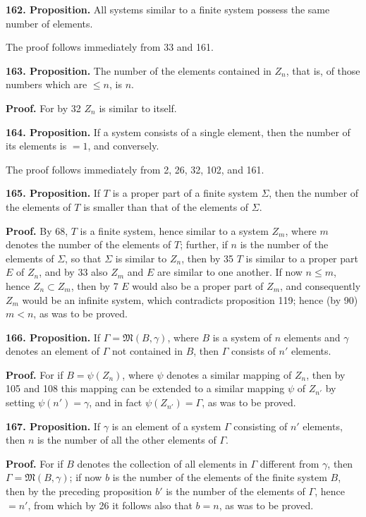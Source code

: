 \documentclass[11pt]{article}
\newcommand{\Mf}{\mathfrak{M}}
\newcommand{\partof}{\mathrel{\subset}}
\begin{document}
\noindent\textbf{162. Proposition.} All systems similar to a finite system possess the same number of elements.

The proof follows immediately from 33 and 161.

\noindent\textbf{163. Proposition.} The number of the elements contained in $Z_n$, that is, of those numbers which are $\leq n$, is $n$.

\noindent\textbf{Proof.} For by 32 $Z_n$ is similar to itself.

\noindent\textbf{164. Proposition.} If a system consists of a single element, then the number of its elements is $=1$, and conversely.

The proof follows immediately from 2, 26, 32, 102, and 161.

\noindent\textbf{165. Proposition.} If $T$ is a proper part of a finite system $\Sigma$, then the number of the elements of $T$ is smaller than that of the elements of $\Sigma$.

\noindent\textbf{Proof.} By 68, $T$ is a finite system, hence similar to a system $Z_m$, where $m$ denotes the number of the elements of $T$; further, if $n$ is the number of the elements of $\Sigma$, so that $\Sigma$ is similar to $Z_n$, then by 35 $T$ is similar to a proper part $E$ of $Z_n$, and by 33 also $Z_m$ and $E$ are similar to one another. If now $n\leq m$, hence $Z_n\partof Z_m$, then by 7 $E$ would also be a proper part of $Z_m$, and consequently $Z_m$ would be an infinite system, which contradicts proposition 119; hence (by 90) $m<n$, as was to be proved.

\noindent\textbf{166. Proposition.} If $\Gamma=\Mf(B,\gamma)$, where $B$ is a system of $n$ elements and $\gamma$ denotes an element of $\Gamma$ not contained in $B$, then $\Gamma$ consists of $n'$ elements.

\noindent\textbf{Proof.} For if $B=\psi(Z_n)$, where $\psi$ denotes a similar mapping of $Z_n$, then by 105 and 108 this mapping can be extended to a similar mapping $\psi$ of $Z_{n'}$ by setting $\psi(n')=\gamma$, and in fact $\psi(Z_{n'})=\Gamma$, as was to be proved.

\noindent\textbf{167. Proposition.} If $\gamma$ is an element of a system $\Gamma$ consisting of $n'$ elements, then $n$ is the number of all the other elements of $\Gamma$.

\noindent\textbf{Proof.} For if $B$ denotes the collection of all elements in $\Gamma$ different from $\gamma$, then $\Gamma=\Mf(B,\gamma)$; if now $b$ is the number of the elements of the finite system $B$, then by the preceding proposition $b'$ is the number of the elements of $\Gamma$, hence $=n'$, from which by 26 it follows also that $b=n$, as was to be proved.
\end{document}
